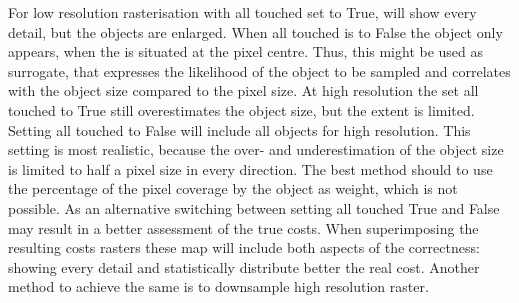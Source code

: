 	



For low resolution rasterisation with all touched set to True, will show every detail, but the objects are enlarged.
When all touched is to False the object only appears, when the is situated at the pixel centre.
Thus, this might be used as surrogate, that expresses the likelihood of the object to be sampled and correlates with the object size  compared to the pixel size.
At high resolution the set all touched to True still overestimates the object size, but the extent is limited.
Setting all touched to False will include all objects for high resolution.
This setting is most realistic, because the over- and underestimation of the object size is limited to half a pixel size in every direction.
The best method should to use the percentage of the pixel coverage by the object as weight, which is not possible.
As an alternative switching between setting all touched True and False may result in a better assessment of the true costs.
When superimposing the resulting costs rasters these map will include both aspects of the correctness: showing every detail and statistically distribute better the real cost.
Another method to achieve the same is to downsample high resolution raster.